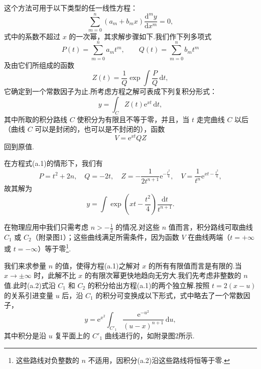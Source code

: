 这个方法可用于以下类型的任一线性方程：
\begin{equation*}
  \sum_{m=0}^{n}\left(a_m+b_mx\right)\frac{\mathrm{d}^my}{\mathrm{d}x^m}=0,
\end{equation*}
式中的系数不超过 $x$ 的一次幂，其求解步骤如下.我们作下列多项式
\begin{equation*}
  P(t)=\sum_{m=0}^{n}a_mt^m,\qquad Q(t)=\sum_{m=0}^{n}b_mt^m
\end{equation*}
及由它们所组成的函数
\begin{equation*}
  Z(t)=\frac{1}{Q}\exp\int\frac{P}{Q}\,\mathrm{d}t,
\end{equation*}
它确定到一个常数因子为止.所考虑方程之解可表成下列复积分形式：
\begin{equation*}
  y=\int_C Z(t)\mathrm{e}^{xt}\,\mathrm{d}t,
\end{equation*}
其中所取的积分路线 $C$ 使积分为有限且不等于零，并且，当 $t$ 走完曲线 $C$ 以后（曲线 $C$ 可以是封闭的，也可以是不封闭的），函数
\begin{equation*}
  V=\mathrm{e}^{xt}QZ
\end{equation*}
回到原值.

在方程式(a.1)的情形下，我们有
\begin{equation*}
  P=t^2+2n,\quad Q=-2t,\quad
  Z=-\frac{1}{2t^{n+1}}\mathrm{e}^{-\frac{t^2}{4}},\quad
  V=\frac{1}{t^n}\mathrm{e}^{xt-\frac{t^2}{4}},
\end{equation*}
故其解为
\begin{equation}
  y=\int\exp\left(xt-\frac{t^2}{4}\right)\frac{\mathrm{d}t}{t^{n+1}}.
\end{equation}

在物理应用中我们只需考虑 $n>-\frac{1}{2}$ 的情况.对这些 $n$ 值而言，积分路线可取曲线 $C_1$ 或 $C_2$（附录图1）；这些曲线满足所需条件，因为函数 $V$ 在曲线两端（$t=+\infty$ 或 $t=-\infty$）等于零\footnote{这些路线对负整数的 $n$ 不适用，因积分(a.2)沿这些路线将恒等于零.}.

我们来求参量 $n$ 的值，使得方程(a.1)之解对 $x$ 的所有有限值而言是有限的.当 $x\to\pm\infty$ 时，此解不比 $x$ 的有限次幂更快地趋向无穷大.我们先考虑非整数的 $n$ 值.此时(a.2)式沿 $C_1$ 和 $C_2$ 的积分给出方程(a.1)的两个独立解.按照 $t=2(x-u)$ 的关系引进变量 $u$ 后，沿 $C_1$ 的积分可变换成以下形式，式中略去了一个常数因子，
\begin{equation}
  y=\mathrm{e}^{x^2}\int_{C'_1}\frac{\mathrm{e}^{-u^2}}{(u-x)^{n+1}}\,\mathrm{d}u,
\end{equation}
其中积分是沿 $u$ 复平面上的 $C'_1$ 曲线进行的，如附录图2所示.

